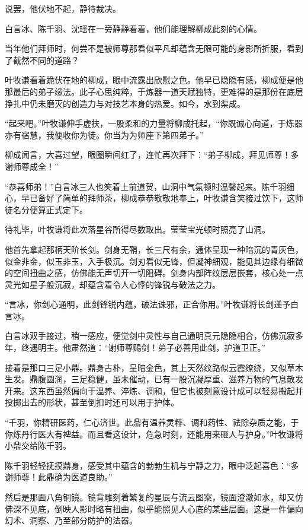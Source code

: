 说罢，他伏地不起，静待裁决。

白言冰、陈千羽、沈瑶在一旁静静看着，他们能理解柳成此刻的心情。

当年他们拜师时，何尝不是被师尊那看似平凡却蕴含无限可能的身影所折服，看到了截然不同的道路？

叶牧谦看着跪伏在地的柳成，眼中流露出欣慰之色。他早已隐隐有感，柳成便是他那最后的弟子缘法。此子心思纯粹，于炼器一道天赋独特，更难得的是那份在底层挣扎中仍未磨灭的创造力与对技艺本身的热爱。如今，水到渠成。

“起来吧。”叶牧谦伸手虚扶，一股柔和的力量将柳成托起，“你既诚心向道，于炼器亦有宿慧，我便收你为徒。你当为为师座下第四弟子。”

柳成闻言，大喜过望，眼圈瞬间红了，连忙再次拜下：“弟子柳成，拜见师尊！多谢师尊成全！”

“恭喜师弟！”白言冰三人也笑着上前道贺，山洞中气氛顿时温馨起来。陈千羽细心，早已备好了简单的拜师茶，柳成恭恭敬敬地奉上，叶牧谦含笑接过饮下，这师徒名分便算正式定下。

待礼毕，叶牧谦将此次落星谷所得尽数取出。莹莹宝光顿时照亮了山洞。

他首先拿起那柄天阶长剑。剑身无鞘，长三尺有余，通体呈现一种暗沉的青灰色，似金非金，似玉非玉，入手极沉。剑刃看似无锋，但凝神细观，能见其边缘有细微的空间扭曲之感，仿佛能无声切开一切阻碍。剑身内部阵纹层层嵌套，核心处一点灵光如星子般沉寂，却蕴含着令人心悸的锋锐与破法之力。

“言冰，你剑心通明，此剑锋锐内蕴，破法诛邪，正合你用。”叶牧谦将长剑递予白言冰。

白言冰双手接过，稍一感应，便觉剑中灵性与自己通明真元隐隐相合，仿佛沉寂多年，终遇明主。他肃然道：“谢师尊赐剑！弟子必善用此剑，护道卫正。”

接着是那口三足小鼎。鼎身古朴，呈暗金色，其上天然纹路似云霞缭绕，又似草木生发。鼎腹圆润，三足稳健，虽未催动，已有一股沉凝厚重、滋养万物的气息散发开来。这东西虽然偏向于温养、淬炼、调和，但它也被刻意设计成可以轻易搬起并投掷出去的形状，甚至倒扣时还可以用于护体。

“千羽，你精研医药，仁心济世。此鼎有温养灵粹、调和药性、祛除杂质之能，于你炼丹行医大有裨益。而且看这设计，危急时刻，还能用来砸人与护身。”叶牧谦将小鼎交给陈千羽。

陈千羽轻轻抚摸鼎身，感受其中蕴含的勃勃生机与宁静之力，眼中泛起喜色：“多谢师尊！此鼎确为医道良助。”

然后是那面八角铜镜。镜背雕刻着繁复的星辰与流云图案，镜面澄澈如水，却又仿佛深不见底，倒映人影时略有扭曲，似乎能照见人心底的某些层面。这是一件偏向幻术、洞察、乃至部分防护的法器。

